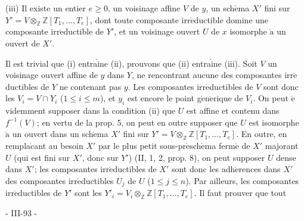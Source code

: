 (iii) Il existe un entier \(e \ge 0\), un voisinage affine \(V\) de \(y\), un sch\(\acute{\text{e}}\)ma \(X'\) fini sur \(Y' = V \otimes_{\mathbb{Z}} \mathbb{Z}[T_1, \dots, T_e]\), dont toute composante irr\(\acute{\text{e}}\)ductible domine une composante irr\(\acute{\text{e}}\)ductible de \(Y'\), et un voisinage ouvert \(U\) de \(x\) isomorphe \(\grave{\text{a}}\) un ouvert de \(X'\).

Il est trivial que (i) entra\(\hat{\text{i}}\)ne (ii), prouvons que (ii) entra\(\hat{\text{i}}\)ne (iii). Soit \(V\) un voisinage ouvert affine de \(y\) dans \(Y\), ne rencontrant aucune des composantes irr\(\acute{\text{e}}\)ductibles de \(Y\) ne contenant pas \(y\). Les composantes irr\(\acute{\text{e}}\)ductibles de \(V\) sont donc les \(V_i = V \cap Y_i\) (\(1 \le i \le m\)), et \(y_i\) est encore le point g\(\acute{\text{e}}\)n\(\acute{\text{e}}\)rique de \(V_i\). On peut \(\acute{\text{e}}\)videmment supposer dans la condition (ii) que \(U\) est affine et contenu dans \(f^{-1}(V)\); en vertu de la prop. 5, on peut en outre supposer que \(U\) est isomorphe \(\grave{\text{a}}\) un ouvert dans un sch\(\acute{\text{e}}\)ma \(X'\) fini sur \(Y' = V \otimes_{\mathbb{Z}} \mathbb{Z}[T_1, \dots, T_e]\). En outre, en rempla\(\grave{\text{c}}\)ant au besoin \(X'\) par le plus petit sous-pr\(\acute{\text{e}}\)sch\(\acute{\text{e}}\)ma ferm\(\acute{\text{e}}\) de \(X'\) majorant \(U\) (qui est fini sur \(X'\), donc sur \(Y'\)) (II, 1, 2, prop. 8), on peut supposer \(U\) dense dans \(X'\); les composantes irr\(\acute{\text{e}}\)ductibles de \(X'\) sont donc les adh\(\acute{\text{e}}\)rences dans \(X'\) des composantes irr\(\acute{\text{e}}\)ductibles \(U_j\) de \(U\) (\(1 \le j \le n\)). Par ailleurs, les composantes irr\(\acute{\text{e}}\)ductibles de \(Y'\) sont les \(Y'_i = V_i \otimes_{\mathbb{Z}} \mathbb{Z}[T_1, \dots, T_e]\). Il faut prouver que tout

\newpage


- III-93 -

